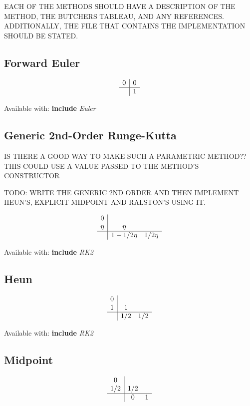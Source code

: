 \documentclass[letterpaper,10pt]{book}
\newcommand{\srcas}[1]{\textbf{include} \textlangle{}\textit{#1}\textrangle{}}
\begin{document}
      EACH OF THE METHODS SHOULD HAVE A DESCRIPTION OF THE METHOD, THE BUTCHERS TABLEAU, AND ANY REFERENCES.  ADDITIONALLY, THE FILE THAT CONTAINS THE IMPLEMENTATION SHOULD BE STATED.
      
      \subsection{Forward Euler}   
	\[
	  \begin{array}{c|c}
	    0 & 0\\
	    \hline
	    & 1
	  \end{array}
	\]
	
	Available with: \srcas{Euler}
	
      \subsection{Generic 2nd-Order Runge-Kutta}
	IS THERE A GOOD WAY TO MAKE SUCH A PARAMETRIC METHOD?? THIS COULD USE A VALUE PASSED TO THE METHOD'S CONSTRUCTOR
	
	TODO: WRITE THE GENERIC 2ND ORDER AND THEN IMPLEMENT HEUN'S, EXPLICIT MIDPOINT AND RALSTON'S USING IT.
	
	\[
	  \begin{array}{c|cc}
	    0 & & \\
	    \eta & \eta & \\
	    \hline
	    & 1-1/2\eta & 1/2\eta
	  \end{array}
	\]

	Available with: \srcas{RK2}
	    
      \subsection{Heun}
	\[
	  \begin{array}{c|cc}
	    0 & & \\
	    1 & 1 & \\
	    \hline
	    & 1/2 & 1/2
	  \end{array}
	\]

	Available with: \srcas{RK2}
	
      \subsection{Midpoint}
	\[
	  \begin{array}{c|cc}
	    0 & & \\
	    1/2 & 1/2 & \\
	    \hline
	    & 0 & 1
	  \end{array}
	\]    
\end{document}
